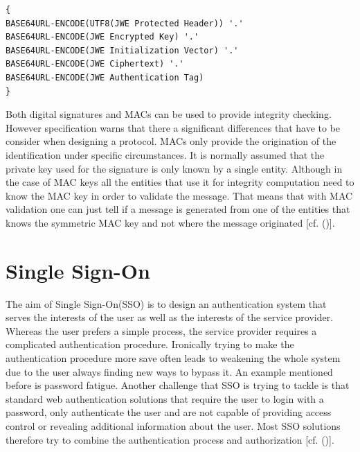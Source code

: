 { 
\begin{lstlisting}
{
BASE64URL-ENCODE(UTF8(JWE Protected Header)) '.'
BASE64URL-ENCODE(JWE Encrypted Key) '.'
BASE64URL-ENCODE(JWE Initialization Vector) '.'
BASE64URL-ENCODE(JWE Ciphertext) '.'
BASE64URL-ENCODE(JWE Authentication Tag)
}
\end{lstlisting}

Both digital signatures and MACs can be used to provide integrity checking. However specification warns that there a significant differences that have to be consider when designing a protocol. MACs only provide the origination of the identification under specific circumstances. It is normally assumed that the private key used for the signature is only known by a single entity. Although in the case of MAC keys all the entities that use it for integrity computation need to know the MAC key in order to validate the message. That means that with MAC validation one can just tell if a message is generated from one of the entities that knows the symmetric MAC key and not where the message originated [cf. (\cite{JWT:IETF:Jones:2015})].

\section{Single Sign-On}

The aim of Single Sign-On(SSO) is to design an authentication system that serves the interests of the user as well as the interests of the service provider. Whereas the user prefers a simple process, the service provider requires a complicated authentication procedure. Ironically trying to make the authentication procedure more save often leads to weakening the whole system due to the user always  finding new ways to bypass it. An example mentioned before is password fatigue. Another challenge that SSO is trying to tackle is that standard web authentication solutions that require the user to login with a password, only authenticate the user and are not capable of providing access control or revealing additional information about the user. Most SSO solutions therefore try to combine the authentication process and authorization [cf. (\cite{Prochazka:2010:UCA})].

}
